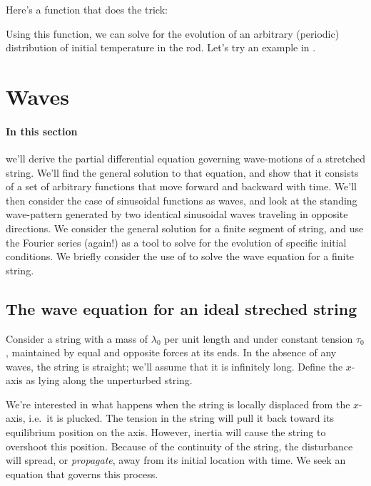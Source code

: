 \documentclass[11pt,twoside,a4paper]{article}
\begin{document}
Here's a function that does the trick:



Using this function, we can solve for the evolution of an arbitrary
(periodic) distribution of initial temperature in the rod.  Let's try
an example in \Mlab.


\section{Waves}
\label{sec:waves_1}

\paragraph{In this section} we'll derive the partial differential
equation governing wave-motions of a stretched string. We'll find the
general solution to that equation, and show that it consists of a set
of arbitrary functions that move forward and backward with time.
We'll then consider the case of sinusoidal functions as waves, and
look at the standing wave-pattern generated by two identical
sinusoidal waves traveling in opposite directions.  We consider the
general solution for a finite segment of string, and use the Fourier
series (again!) as a tool to solve for the evolution of specific
initial conditions. We briefly consider the use of \Mlab to solve the
wave equation for a finite string.  

\subsection{The wave equation for an ideal streched string}

Consider a string with a mass of $\lambda_0$ per unit length and under
constant tension $\tau_0$, maintained by equal and opposite forces at
its ends.  In the absence of any waves, the string is straight; we'll
assume that it is infinitely long.  Define the $x$-axis as lying along
the unperturbed string. 

We're interested in what happens when the string is locally displaced
from the $x$-axis, i.e.~it is plucked.  The tension in the string will
pull it back toward its equilibrium position on the axis.  However,
inertia will cause the string to overshoot this position.  Because of
the continuity of the string, the disturbance will spread, or
\textit{propagate}, away from its initial location with time.  We seek
an equation that governs this process.
\end{document}
